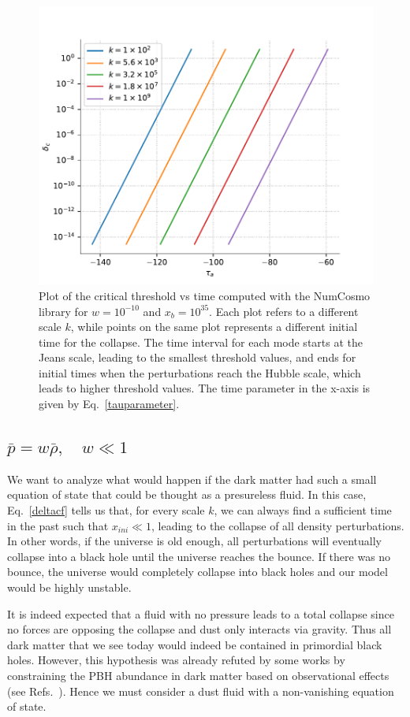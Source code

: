 \documentclass[a4paper,11pt]{article}
\begin{document}
\begin{figure}[tbp]
	\centering
	\includegraphics[width=.6\textwidth]{deltac_jh_vs_tau.pdf}
	\caption{ Plot of the critical threshold vs time computed with the NumCosmo library
		for $w = 10^{-10}$ and $x_b = 10^{35}$. Each plot refers to a different scale $k$,
		while points on the same plot represents a different initial time for the collapse.
		The time interval for each mode starts at the Jeans scale, leading to the smallest
		threshold values, and ends for initial times when the perturbations reach the Hubble
		scale, which leads to higher threshold values. The time parameter in the x-axis is
		given by Eq.~\eqref{tauparameter}.}
	\label{deltacfig}
\end{figure}
\newpage
\subsection{$\bar{p} = w \bar{\rho}, \quad w \ll 1$}

We want to analyze what would happen if the dark matter had such a small equation of
state that could be thought as a presureless fluid. In this case, Eq.~\eqref{deltacf}
tells us that, for every scale $k$, we can always find a sufficient time in the past
such that $x_{ini} \ll 1$, leading to the collapse of all density perturbations. In
other words, if the universe is old enough, all perturbations will eventually collapse
into a black hole until the universe reaches the bounce. If there was no bounce, the
universe would completely collapse into black holes and our model would be highly
unstable.

It is indeed expected that a fluid with no pressure leads to a total collapse since no
forces are opposing the collapse and dust only interacts via gravity. Thus all dark
matter that we see today would indeed be contained in primordial black holes. However,
this hypothesis was already refuted by some works by constraining the PBH abundance in
dark matter based on observational effects (see Refs.~\cite{Villanueva2021, Carr2021}).
Hence we must consider a dust fluid with a non-vanishing equation of state.
\end{document}
